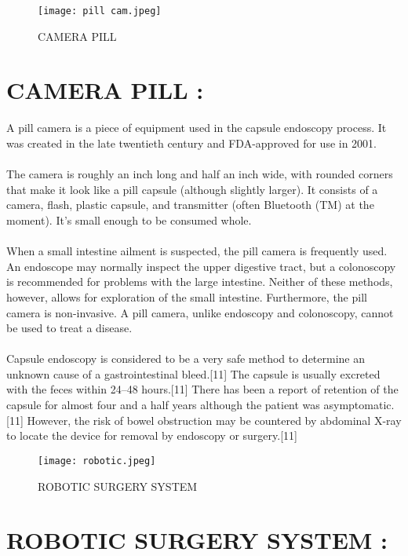 \documentclass[a4paper,12pt]{article}
\begin{document}
\begin{figure}
\centering
\texttt{[image: pill cam.jpeg]}
\caption{CAMERA PILL }
\end{figure}
\section{CAMERA PILL :}

 \medspace

A pill camera is a piece of equipment used in the capsule endoscopy process. It was created in the late twentieth century and FDA-approved for use in 2001.
\\
\\
  The camera is roughly an inch long and half an inch wide, with rounded corners that make it look like a pill capsule (although slightly larger). It consists of a camera, flash, plastic capsule, and transmitter (often Bluetooth (TM) at the moment). It's small enough to be consumed whole.
\\
\\
  When a small intestine ailment is suspected, the pill camera is frequently used. An endoscope may normally inspect the upper digestive tract, but a colonoscopy is recommended for problems with the large intestine. Neither of these methods, however, allows for exploration of the small intestine. Furthermore, the pill camera is non-invasive. A pill camera, unlike endoscopy and colonoscopy, cannot be used to treat a disease. 
  \\
  \\
  Capsule endoscopy is considered to be a very safe method to determine an unknown cause of a gastrointestinal bleed.[11] The capsule is usually excreted with the feces within 24–48 hours.[11] There has been a report of retention of the capsule for almost four and a half years although the patient was asymptomatic.[11] However, the risk of bowel obstruction may be countered by abdominal X-ray to locate the device for removal by endoscopy or surgery.[11]
\clearpage
 
  
  
  


 \begin{figure}
\centering
\texttt{[image: robotic.jpeg]}
\caption{ROBOTIC SURGERY SYSTEM }
\end{figure}
  
\section{ROBOTIC SURGERY SYSTEM :}
\end{document}
